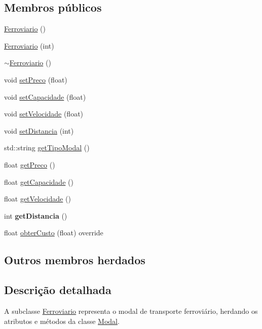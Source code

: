\subsection*{Membros públicos}
\begin{DoxyCompactItemize}
\item 
\hyperlink{classFerroviario_ad9ab87f65b1e904a3fec909076f0a993}{Ferroviario} ()
\item 
\hyperlink{classFerroviario_a497cd242a790babb459821c59ff3678c}{Ferroviario} (int)
\item 
\hyperlink{classFerroviario_a14356b699e7cd2651654ef06029d2f0d}{$\sim$\+Ferroviario} ()
\item 
void \hyperlink{classFerroviario_a51c231a25084ce9bef1648642196b94e}{set\+Preco} (float)
\item 
void \hyperlink{classFerroviario_aa40975457d7179ba75d5436251ca66e0}{set\+Capacidade} (float)
\item 
void \hyperlink{classFerroviario_a773bb8838b8e651c5a59a196fd3df6be}{set\+Velocidade} (float)
\item 
void \hyperlink{classFerroviario_a3015ee3389051f06e8bccbd70832ca4a}{set\+Distancia} (int)
\item 
std\+::string \hyperlink{classFerroviario_a6d75f014c46c8c24ed2c121baa1cda0b}{get\+Tipo\+Modal} ()
\item 
float \hyperlink{classFerroviario_a2face4e080b96591614237d88bda094c}{get\+Preco} ()
\item 
float \hyperlink{classFerroviario_a990ce4dac67327abd75d66f94bf5d358}{get\+Capacidade} ()
\item 
float \hyperlink{classFerroviario_a643ac2394764eb83835e63088f116ac4}{get\+Velocidade} ()
\item 
\mbox{\label{classFerroviario_a80ae820b1f0e8cffd0063c332404c765}} 
int {\bfseries get\+Distancia} ()
\item 
float \hyperlink{classFerroviario_a691452311fe49e6573e47220fa372d15}{obter\+Custo} (float) override
\end{DoxyCompactItemize}
\subsection*{Outros membros herdados}


\subsection{Descrição detalhada}
A subclasse \hyperlink{classFerroviario}{Ferroviario} representa o modal de transporte ferroviário, herdando os atributos e métodos da classe \hyperlink{classModal}{Modal}. 

